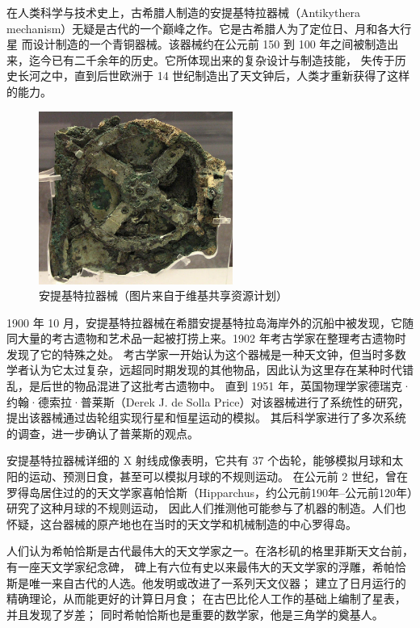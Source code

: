 \documentclass[a4paper,10.5pt]{book}
\begin{document}
在人类科学与技术史上，古希腊人制造的安提基特拉器械（Antikythera mechanism）无疑是古代的一个巅峰之作。它是古希腊人为了定位日、月和各大行星
而设计制造的一个青铜器械。该器械约在公元前 150 到 100 年之间被制造出来，迄今已有二千余年的历史。它所体现出来的复杂设计与制造技能，
失传于历史长河之中，直到后世欧洲于 14 世纪制造出了天文钟后，人类才重新获得了这样的能力。

\begin{figure}[ht]
\centering
\includegraphics[width=2.5in]{images/1_03-Antikythera.jpg}
\caption{安提基特拉器械（图片来自于维基共享资源计划）}
\end{figure}

1900 年 10 月，安提基特拉器械在希腊安提基特拉岛海岸外的沉船中被发现，它随同大量的考古遗物和艺术品一起被打捞上来。1902 年考古学家在整理考古遗物时发现了它的特殊之处。
考古学家一开始认为这个器械是一种天文钟，但当时多数学者认为它太过复杂，远超同时期发现的其他物品，因此认为这里存在某种时代错乱，是后世的物品混进了这批考古遗物中。
直到 1951 年，英国物理学家德瑞克·约翰·德索拉·普莱斯（Derek J. de Solla Price）对该器械进行了系统性的研究，提出该器械通过齿轮组实现行星和恒星运动的模拟。
其后科学家进行了多次系统的调查，进一步确认了普莱斯的观点。

安提基特拉器械详细的 X 射线成像表明，它共有 37 个齿轮，能够模拟月球和太阳的运动、预测日食，甚至可以模拟月球的不规则运动。
在公元前 2 世纪，曾在罗得岛居住过的的天文学家喜帕恰斯（Hipparchus，约公元前190年–公元前120年）研究了这种月球的不规则运动，
因此人们推测他可能参与了机器的制造。人们也怀疑，这台器械的原产地也在当时的天文学和机械制造的中心罗得岛。

人们认为希帕恰斯是古代最伟大的天文学家之一。在洛杉矶的格里菲斯天文台前，有一座天文学家纪念碑，
碑上有六位有史以来最伟大的天文学家的浮雕，希帕恰斯是唯一来自古代的人选。他发明或改进了一系列天文仪器；
建立了日月运行的精确理论，从而能更好的计算日月食； 在古巴比伦人工作的基础上编制了星表，并且发现了岁差；
同时希帕恰斯也是重要的数学家，他是三角学的奠基人。
\end{document}
